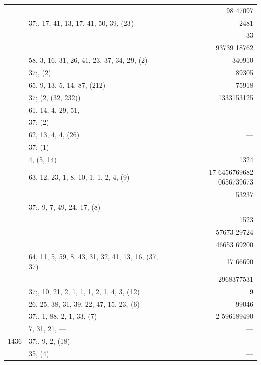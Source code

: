 \documentclass[11pt]{article}
\begin{document}
{\begin{longtable}{|r|p{8.5cm}|r|}
       & & 98 47097 \\
       & $37$;\; 57, 17, 41, 13, 17, 41, 50, 39, (23) & 2481 \\
       & & 33 \\
       & & 93739 18762 \\
       & 58, 3, 16, 31, 26, 41, 23, 37, 34, 29, (2) & 340910 \\
       & $37$;\; 1, (2) & 89305 \\
       & 65, 9, 13, 5, 14, 87, (212) & 75918 \\
       & $37$;\; (2, (32, 232)) & 1333153125 \\
       & 61, 14, 4, 29, 51, & --- \\
       & $37$;\; (2) & --- \\
       & 62, 13, 4, 4, (26) & --- \\
       & $37$;\; (1) & --- \\
       & 4, (5, 14) & 1324 \\
       & 63, 12, 23, 1, 8, 10, 1, 1, 2, 4, (9) & 17 6456769682 0656739673 \\
       & & 53237 \\
       & $37$;\; 63, 9, 7, 49, 24, 17, (8) & --- \\
       & & 1523 \\
       & & 57673 29724 \\
       & & 46653 69200 \\
       & 64, 11, 5, 59, 8, 43, 31, 32, 41, 13, 16, (37, 37) & 17 66690 \\
       & & 2968377531 \\
       & $37$;\; 65, 10, 21, 2, 1, 1, 1, 2, 1, 4, 3, (12) & 9 \\
       & 26, 25, 38, 31, 39, 22, 47, 15, 23, (6) & 99046 \\
       & $37$;\; 66, 1, 88, 2, 1, 33, (7) & 2 596189490 \\
       & 7, 31, 21, --- & --- \\
\hline
1436   & $37$;\; 67, 9, 2, (18) & --- \\
       & 35, (4) & --- \\
\hline
\end{longtable}
}
\end{document}
